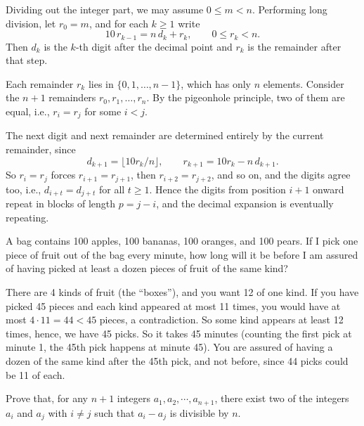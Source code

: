 \begin{solution}
  Dividing out the integer part, we may assume $0 \le m < n$. Performing long division, let $r_0 = m$, and for each $k \ge 1$ write
  \[%
    10\,r_{k-1} = n\,d_k + r_k, \qquad 0 \le r_k < n
  .\]%
  Then $d_k$ is the $k$-th digit after the decimal point and $r_k$ is the remainder after that step.

  Each remainder $r_k$ lies in $\{0, 1, \dots, n-1\}$, which has only $n$ elements. Consider the $n+1$ remainders $r_0, r_1, \dots, r_n$. By the pigeonhole principle, two of them are equal, i.e., $r_i = r_j$ for some $i < j$.

  The next digit and next remainder are determined entirely by the current remainder, since
  \[%
    d_{k+1} = \lfloor 10 r_k / n \rfloor, \qquad r_{k+1} = 10 r_k - n\,d_{k+1}
  .\]%
  So $r_i = r_j$ forces $r_{i+1} = r_{j+1}$, then $r_{i+2} = r_{j+2}$, and so on, and the digits agree too, i.e., $d_{i+t} = d_{j+t}$ for all $t \ge 1$. Hence the digits from position $i+1$ onward repeat in blocks of length $p = j - i$, and the decimal expansion is eventually repeating.
\end{solution}

\begin{problem}[14]
  A bag contains 100 apples, 100 bananas, 100 oranges, and 100 pears. If I pick one piece of fruit out of the bag every minute, how long will it be before I am assured of having picked at least a dozen pieces of fruit of the same kind?
\end{problem}

\begin{solution}
  There are 4 kinds of fruit (the ``boxes''), and you want 12 of one kind. If you have picked 45 pieces and each kind appeared at most 11 times, you would have at most $4\cdot 11 = 44 < 45$ pieces, a contradiction. So some kind appears at least 12 times, hence, we have 45 picks. So it takes 45 minutes (counting the first pick at minute 1, the 45th pick happens at minute 45). You are assured of having a dozen of the same kind after the 45th pick, and not before, since 44 picks could be 11 of each.
\end{solution}

\begin{problem}[15]
  Prove that, for any $n + 1$ integers $a_1, a_2, \cdots, a_{n+1}$, there exist two of the integers $a_i$ and $a_j$ with $i \ne j$ such that $a_i - a_j$ is divisible by $n$.
\end{problem}

